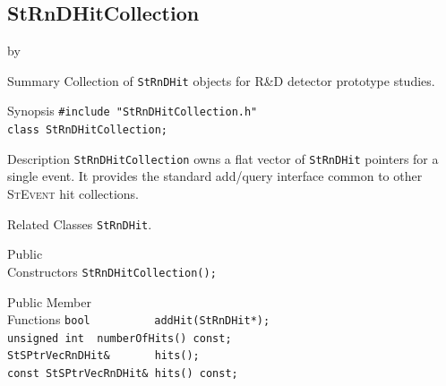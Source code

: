 \documentclass[twoside]{article}
\newcommand{\entrylabel}[1]{\mbox{\textbf{{#1}}}\hfil}%
\newenvironment{entry}
{\begin{list}{}%
    {\renewcommand{\makelabel}{\entrylabel}%
     \setlength{\labelwidth}{90pt}%
     \setlength{\leftmargin}{\labelwidth}
     \advance\leftmargin by \labelsep%
      }%
    }%
  {\end{list}}
\newcommand{\Entrylabel}[1]%
{\raisebox{0pt}[1ex][0pt]{\makebox[\labelwidth][l]%
    {\parbox[t]{\labelwidth}{\hspace{0pt}\textbf{{#1}}}}}}
\newenvironment{Entry}%
{\renewcommand{\entrylabel}{\Entrylabel}\begin{entry}}%
  {\end{entry}}
\begin{document}
\subsection{StRnDHitCollection}
\label{sec:StRnDHitCollection}
\begin{Entry}
\item[Summary]
    Collection of \texttt{StRnDHit} objects for R\&D detector prototype
    studies.

\item[Synopsis]
    \verb+#include "StRnDHitCollection.h"+\\
    \verb+class StRnDHitCollection;+\\

\item[Description]
    \texttt{StRnDHitCollection} owns a flat vector of \texttt{StRnDHit}
    pointers for a single event.  It provides the standard add/query
    interface common to other \textsc{StEvent} hit collections.

\item[Related Classes]
    \texttt{StRnDHit}.

\item[Public\\ Constructors]
    \verb+StRnDHitCollection();+\\

\item[Public Member\\ Functions]
    \verb+bool          addHit(StRnDHit*);+\\
    \verb+unsigned int  numberOfHits() const;+\\
    \verb+StSPtrVecRnDHit&       hits();+\\
    \verb+const StSPtrVecRnDHit& hits() const;+\\
\end{Entry}
\clearpage

\end{document}
